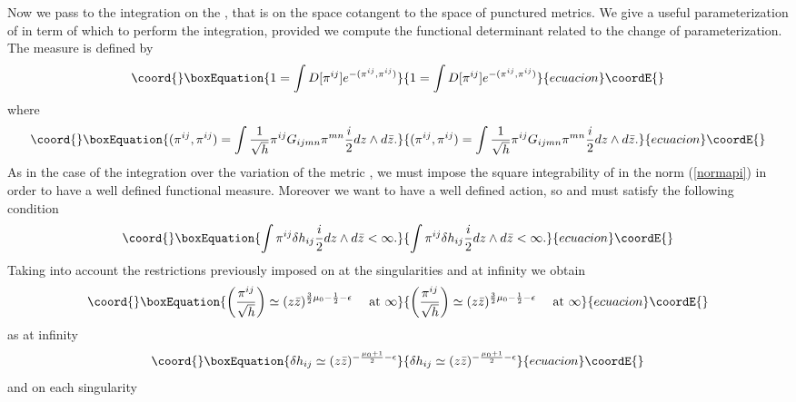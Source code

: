 \documentclass[a4paper,12pt]{article}
\begin{document}
Now we pass to the integration on the \coordHE{}, that is on the
space cotangent to the space of punctured metrics. 
We give a useful parameterization of
\coordHE{} in term of which to perform the integration, provided we
compute the functional determinant related to the change of
parameterization.  The measure \coordHE{} is defined by
\begin{equation}\coord{}\boxEquation{
1=\int D[\pi^{ij}] e^{-(\pi^{ij},\pi^{ij})}
}{
1=\int D[\pi^{ij}] e^{-(\pi^{ij},\pi^{ij})}
}{ecuacion}\coordE{}\end{equation}
where 
\begin{equation}\coord{}\boxEquation{\label{normapi}
(\pi^{ij}, \pi^{ij})=\int \frac{1}{\sqrt h}  \pi^{ij} G_{ijmn}\pi^{mn} 
\frac{i}{2}dz\wedge d\bar z.
}{(\pi^{ij}, \pi^{ij})=\int \frac{1}{\sqrt h}  \pi^{ij} G_{ijmn}\pi^{mn} 
\frac{i}{2}dz\wedge d\bar z.
}{ecuacion}\coordE{}\end{equation}
As in the case of the integration over the variation of the metric
\coordHE{}, we must impose the square integrability of \coordHE{}
in the norm (\ref{normapi}) in order to have a well defined functional
measure.  Moreover we want to have a well defined action, so \coordHE{} and \coordHE{} must satisfy the following condition
\begin{equation}\coord{}\boxEquation{
\int \pi^{ij} \delta h_{ij} \frac{i}{2} dz \wedge d\bar z < \infty.
}{
\int \pi^{ij} \delta h_{ij} \frac{i}{2} dz \wedge d\bar z < \infty.
}{ecuacion}\coordE{}\end{equation}
Taking into account the restrictions previously imposed on \coordHE{} at the singularities and at infinity we obtain
\begin{equation}\coord{}\boxEquation{
\left(\frac{\pi^{ij} }{\sqrt h}\right) \simeq (z \bar
z)^{\frac{3}{2}\mu_0 -\frac{1}{2}-\epsilon} ~~~~{\rm at}~\infty
}{
\left(\frac{\pi^{ij} }{\sqrt h}\right) \simeq (z \bar
z)^{\frac{3}{2}\mu_0 -\frac{1}{2}-\epsilon} ~~~~{\rm at}~\infty
}{ecuacion}\coordE{}\end{equation}
as at infinity
\begin{equation}\coord{}\boxEquation{
\delta h_{ij} \simeq (z \bar z)^{-\frac{\mu_0+1}{2} -\epsilon}
}{
\delta h_{ij} \simeq (z \bar z)^{-\frac{\mu_0+1}{2} -\epsilon}
}{ecuacion}\coordE{}\end{equation}
and on each singularity
\end{document}
